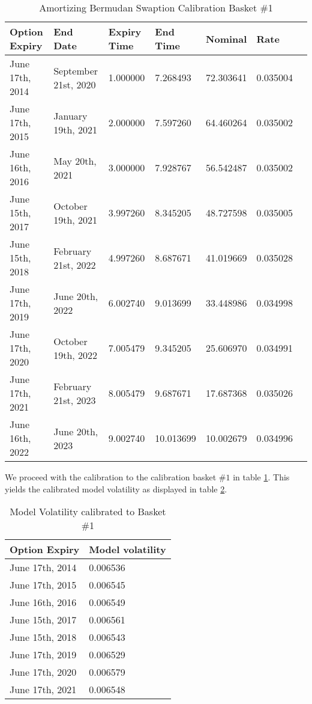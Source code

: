 \documentclass{amsart}
\theoremstyle{plain}
\numberwithin{equation}{section}
\begin{document}
\begin{table}[ht]
\caption{Amortizing Bermudan Swaption Calibration Basket \#1}
\begin{tabular}{l | l | l | l | l | l | l}
Option Expiry & End Date & Expiry Time & End Time & Nominal & Rate \\ \hline
June 17th, 2014 & September 21st, 2020 & 1.000000 & 7.268493 & 72.303641 & 0.035004 \\
June 17th, 2015 & January 19th, 2021 & 2.000000 & 7.597260 & 64.460264 & 0.035002 \\
June 16th, 2016 & May 20th, 2021 & 3.000000 & 7.928767 & 56.542487 & 0.035002 \\
June 15th, 2017 & October 19th, 2021 & 3.997260 & 8.345205 & 48.727598 & 0.035005 \\
June 15th, 2018 & February 21st, 2022 & 4.997260 & 8.687671 & 41.019669 & 0.035028 \\
June 17th, 2019 & June 20th, 2022 & 6.002740 & 9.013699 & 33.448986 & 0.034998 \\
June 17th, 2020 & October 19th, 2022 & 7.005479 & 9.345205 & 25.606970 & 0.034991 \\
June 17th, 2021 & February 21st, 2023 & 8.005479 & 9.687671 & 17.687368 & 0.035026 \\
June 16th, 2022 & June 20th, 2023 & 9.002740 & 10.013699 & 10.002679 & 0.034996
\end{tabular}
\label{amortizingBermudanSwaption}
\end{table}

We proceed with the calibration to the calibration basket $\#1$ in table \ref{amortizingBermudanSwaption}. This yields the calibrated model volatility as displayed in table \ref{amortizingBermudanSwaptionModelCal}.

\begin{table}[ht]
\caption{Model Volatility calibrated to Basket \#1}
\begin{tabular}{l | l }
Option Expiry & Model volatility \\ \hline
June 17th, 2014 & 0.006536 \\
June 17th, 2015 & 0.006545 \\
June 16th, 2016 & 0.006549 \\
June 15th, 2017 & 0.006561 \\
June 15th, 2018 & 0.006543 \\
June 17th, 2019 & 0.006529 \\
June 17th, 2020 & 0.006579 \\
June 17th, 2021 & 0.006548
\end{tabular}
\label{amortizingBermudanSwaptionModelCal}
\end{table}
\end{document}
